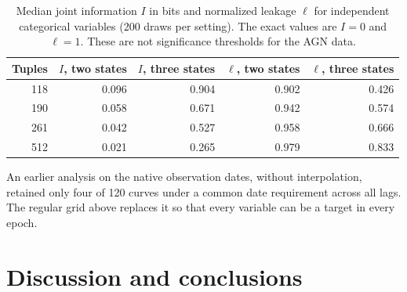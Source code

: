 \documentclass[fleqn,usenatbib]{mnras}
\newenvironment{SURDtable}{\begin{table}}{\end{table}}
\begin{document}
\begin{SURDtable}
\centering
\caption{Median joint information $I$ in bits and normalized leakage $\ell$ for
independent categorical variables (200 draws per setting). The exact values are $I=0$
and $\ell=1$. These are not significance thresholds for the AGN data.}
\label{tab:ep_calibration}
\small
\begin{tabular}{rrrrr}
\toprule
Tuples & $I$, two states & $I$, three states & $\ell$, two states & $\ell$, three states \\
\midrule
118 & 0.096 & 0.904 & 0.902 & 0.426 \\
190 & 0.058 & 0.671 & 0.942 & 0.574 \\
261 & 0.042 & 0.527 & 0.958 & 0.666 \\
512 & 0.021 & 0.265 & 0.979 & 0.833 \\
\bottomrule
\end{tabular}

\end{SURDtable}

An earlier analysis on the native observation dates, without interpolation,
retained only four of 120 curves under a common date requirement across all lags.
The regular grid above replaces it so that every variable can be a target in every
epoch.

\clearpage


\section{Discussion and conclusions}
\label{sec:epoch_conclusions}
\end{document}
